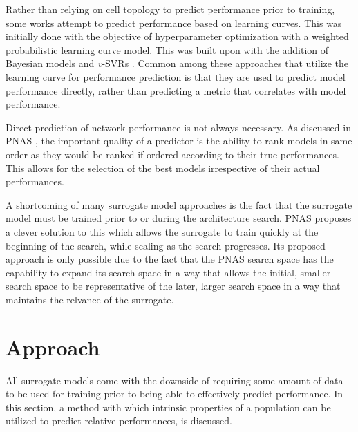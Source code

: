 \documentclass[twocolumn]{article}
\begin{document}
Rather than relying on cell topology to predict performance prior to training, some works attempt to predict performance based on learning curves.
This was initially done with the objective of hyperparameter optimization \cite{hparam_opt_1} with a weighted probabilistic learning curve model.
This was built upon with the addition of Bayesian models \cite{bayesian_pred} and \emph{v}-SVRs \cite{vsvr_pred}.
Common among these approaches that utilize the learning curve for performance prediction is that they are used to predict model performance directly,
rather than predicting a metric that correlates with model performance.

Direct prediction of network performance is not always necessary. 
As discussed in PNAS \cite{pnas}, the important quality of a predictor is the ability to rank models in same order as they would be ranked if ordered
according to their true performances.
This allows for the selection of the best models irrespective of their actual performances.

A shortcoming of many surrogate model approaches is the fact that the surrogate model must be trained prior to or during the architecture search.
PNAS \cite{pnas} proposes a clever solution to this which allows the surrogate to train quickly at the beginning of the search, while scaling as the search progresses.
Its proposed approach is only possible due to the fact that the PNAS search space has the capability to expand its search space in a way that
allows the initial, smaller search space to be representative of the later, larger search space in a way that maintains the relvance of the surrogate.


\section{Approach}

All surrogate models come with the downside of requiring some amount of data to be used for training prior to being able to effectively predict performance.
In this section, a method with which intrinsic properties of a population can be utilized to predict relative performances, is discussed.
\end{document}

